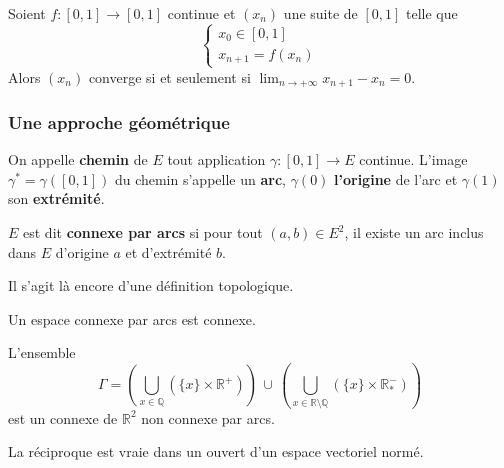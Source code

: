   \begin{corollary}
    Soient $f : [0, 1] \rightarrow [0, 1]$ continue et $(x_n)$ une suite de $[0, 1]$ telle que
    \[ \begin{cases} x_0 \in [0, 1] \\ x_{n+1} = f(x_n) \end{cases} \]
    Alors $(x_n)$ converge si et seulement si $\lim_{n \rightarrow +\infty } x_{n+1} - x_n = 0$.
  \end{corollary}

  \subsubsection{Une approche géométrique}


  \begin{definition}
    On appelle \textbf{chemin} de $E$ tout application $\gamma : [0,1] \rightarrow E$ continue. L'image $\gamma^* = \gamma([0,1])$ du chemin s'appelle un \textbf{arc}, $\gamma(0)$ \textbf{l'origine} de l'arc et $\gamma(1)$ son \textbf{extrémité}.
  \end{definition}

  \begin{definition}
    $E$ est dit \textbf{connexe par arcs} si pour tout $(a,b) \in E^2$, il existe un arc inclus dans $E$ d'origine $a$ et d'extrémité $b$.
  \end{definition}

  \begin{remark}
    Il s'agit là encore d'une définition topologique.
  \end{remark}

  \begin{theorem}
    Un espace connexe par arcs est connexe.
  \end{theorem}

  \begin{cexample}
    L'ensemble
    \[
      \Gamma = \left( \bigcup_{x \in \mathbb{Q}} (\{ x \} \times \mathbb{R}^+) \right) \, \cup \, \left( \bigcup_{x \in \mathbb{R} \setminus \mathbb{Q}} (\{ x \} \times \mathbb{R}^-_*) \right)
    \]
    est un connexe de $\mathbb{R}^2$ non connexe par arcs.
  \end{cexample}

  \begin{proposition}
    La réciproque est vraie dans un ouvert d'un espace vectoriel normé.
  \end{proposition}


